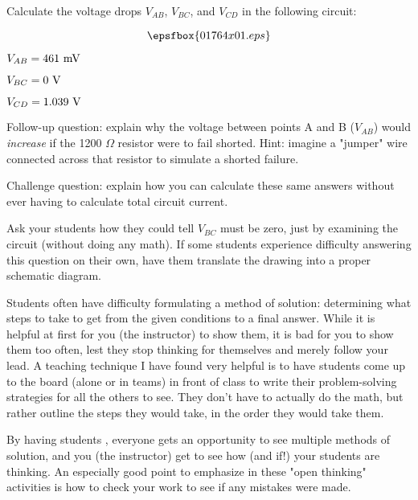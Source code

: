 

Calculate the voltage drops $V_{AB}$, $V_{BC}$, and $V_{CD}$ in the following circuit:

$$\epsfbox{01764x01.eps}$$







$V_{AB} = 461 \hbox{ mV}$

$V_{BC} = 0 \hbox{ V}$

$V_{CD} = 1.039 \hbox{ V}$

\vskip 10pt

Follow-up question: explain why the voltage between points A and B ($V_{AB}$) would {\it increase} if the 1200 $\Omega$ resistor were to fail shorted.  Hint: imagine a "jumper" wire connected across that resistor to simulate a shorted failure.

\vskip 10pt

Challenge question: explain how you can calculate these same answers without ever having to calculate total circuit current.







Ask your students how they could tell $V_{BC}$ must be zero, just by examining the circuit (without doing any math).  If some students experience difficulty answering this question on their own, have them translate the drawing into a proper schematic diagram.

\vskip 10pt

Students often have difficulty formulating a method of solution: determining what steps to take to get from the given conditions to a final answer.  While it is helpful at first for you (the instructor) to show them, it is bad for you to show them too often, lest they stop thinking for themselves and merely follow your lead.  A teaching technique I have found very helpful is to have students come up to the board (alone or in teams) in front of class to write their problem-solving strategies for all the others to see.  They don't have to actually do the math, but rather outline the steps they would take, in the order they would take them.

By having students , everyone gets an opportunity to see multiple methods of solution, and you (the instructor) get to see how (and if!) your students are thinking.  An especially good point to emphasize in these "open thinking" activities is how to check your work to see if any mistakes were made.




